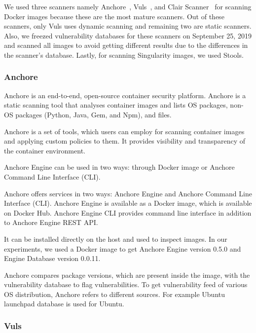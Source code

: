 \documentclass[a4paper,num-refs]{oup-contemporary}
\begin{document}
We used three scanners namely Anchore~\cite{github_2019}, Vuls~\cite{future-architect_2019}, and
Clair Scanner~\cite{arminc_2019} for scanning Docker images because these are the most
mature scanners. Out of these scanners, only Vuls uses dynamic scanning and remaining two
are static scanners.
Also, we freezed vulnerability databases for these scanners on September 25, 2019 and scanned
all images to avoid getting different results due to the differences in the scanner's database.
Lastly, for scanning Singularity images, we used Stools.

\subsubsection{Anchore}

Anchore is an end-to-end, open-source container security platform. Anchore
is a static
scanning tool that analyses container images and lists OS
packages, non-OS packages (Python, Java, Gem, and Npm), and files.
\begin{comments}
Anchore is a set of tools, which users can
employ for scanning container images and applying custom policies to them.
It provides visibility and transparency of the container environment.
\end{comments}
Anchore Engine can be used in two ways: through Docker image or Anchore
Command Line Interface (CLI).
\begin{comments}
Anchore offers services in two ways: Anchore Engine and Anchore
Command Line Interface (CLI). Anchore Engine is available as a Docker
image, which is available on Docker Hub. Anchore Engine CLI provides
command line interface in addition to Anchore Engine REST API. 
\end{comments}
It can be
installed directly on the host and used to inspect images.
In our experiments, we used a Docker image to get Anchore Engine version 0.5.0 and Engine Database
version 0.0.11.

Anchore compares package versions, which are present inside the
image, with the vulnerability database to flag vulnerabilities.
To get vulnerability feed of various OS distribution, Anchore refers to
different sources. For example Ubuntu launchpad database is used for Ubuntu. 

\subsubsection{Vuls}
\end{document}
